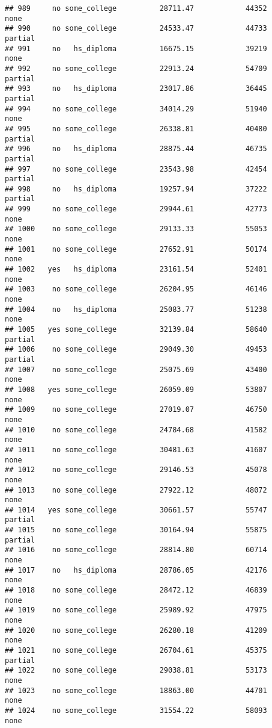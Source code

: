 \documentclass[
]{article}
\begin{document}
\begin{verbatim}
## 989     no some_college          28711.47            44352        none
## 990     no some_college          24533.47            44733     partial
## 991     no   hs_diploma          16675.15            39219        none
## 992     no some_college          22913.24            54709     partial
## 993     no   hs_diploma          23017.86            36445     partial
## 994     no some_college          34014.29            51940        none
## 995     no some_college          26338.81            40480     partial
## 996     no   hs_diploma          28875.44            46735     partial
## 997     no some_college          23543.98            42454     partial
## 998     no   hs_diploma          19257.94            37222     partial
## 999     no some_college          29944.61            42773        none
## 1000    no some_college          29133.33            55053        none
## 1001    no some_college          27652.91            50174        none
## 1002   yes   hs_diploma          23161.54            52401        none
## 1003    no some_college          26204.95            46146        none
## 1004    no   hs_diploma          25083.77            51238        none
## 1005   yes some_college          32139.84            58640     partial
## 1006    no some_college          29049.30            49453     partial
## 1007    no some_college          25075.69            43400        none
## 1008   yes some_college          26059.09            53807        none
## 1009    no some_college          27019.07            46750        none
## 1010    no some_college          24784.68            41582        none
## 1011    no some_college          30481.63            41607        none
## 1012    no some_college          29146.53            45078        none
## 1013    no some_college          27922.12            48072        none
## 1014   yes some_college          30661.57            55747     partial
## 1015    no some_college          30164.94            55875     partial
## 1016    no some_college          28814.80            60714        none
## 1017    no   hs_diploma          28786.05            42176        none
## 1018    no some_college          28472.12            46839        none
## 1019    no some_college          25989.92            47975        none
## 1020    no some_college          26280.18            41209        none
## 1021    no some_college          26704.61            45375     partial
## 1022    no some_college          29038.81            53173        none
## 1023    no some_college          18863.00            44701        none
## 1024    no some_college          31554.22            58093        none

\end{verbatim}
\end{document}
